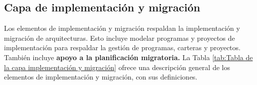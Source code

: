 


\subsection{Capa de implementación y migración}
Los elementos de implementación y migración respaldan la implementación y migración de arquitecturas. Esto incluye modelar programas y proyectos de implementación para respaldar la gestión de programas, carteras y proyectos. También incluye \textbf{apoyo a la planificación migratoria.}
La Tabla \ref{tab:Tabla de la capa implementación y migración} ofrece una descripción general de los elementos de implementación y migración, con sus definiciones.\cite{archimate} 

